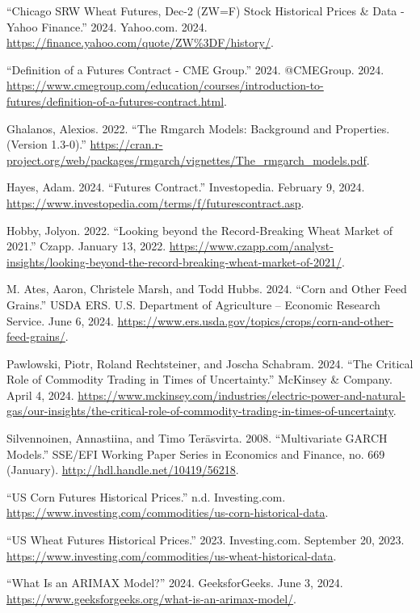 \documentclass[11pt]{article}
\newenvironment{references}
  {\begin{list}{}{%
      \setlength{\leftmargin}{0.4in}%
      \setlength{\itemindent}{-0.4in}%
      \setlength{\itemsep}{0.6\baselineskip}%
      \setlength{\parsep}{0pt}%
  }}
  {\end{list}}
\begin{document}
\begin{references}

\item ``Chicago SRW Wheat Futures, Dec-2 (ZW=F) Stock Historical Prices \& Data - Yahoo Finance.'' 2024. Yahoo.com. 2024. \url{https://finance.yahoo.com/quote/ZW\%3DF/history/}.

\item ``Definition of a Futures Contract - CME Group.'' 2024. @CMEGroup. 2024. \url{https://www.cmegroup.com/education/courses/introduction-to-futures/definition-of-a-futures-contract.html}.

\item Ghalanos, Alexios. 2022. ``The Rmgarch Models: Background and Properties. (Version 1.3-0).'' \url{https://cran.r-project.org/web/packages/rmgarch/vignettes/The_rmgarch_models.pdf}.

\item Hayes, Adam. 2024. ``Futures Contract.'' Investopedia. February 9, 2024. \url{https://www.investopedia.com/terms/f/futurescontract.asp}.

\item Hobby, Jolyon. 2022. ``Looking beyond the Record-Breaking Wheat Market of 2021.'' Czapp. January 13, 2022. \url{https://www.czapp.com/analyst-insights/looking-beyond-the-record-breaking-wheat-market-of-2021/}.

\item M. Ates, Aaron, Christele Marsh, and Todd Hubbs. 2024. ``Corn and Other Feed Grains.'' USDA ERS. U.S. Department of Agriculture -- Economic Research Service. June 6, 2024. \url{https://www.ers.usda.gov/topics/crops/corn-and-other-feed-grains/}.

\item Pawlowski, Piotr, Roland Rechtsteiner, and Joscha Schabram. 2024. ``The Critical Role of Commodity Trading in Times of Uncertainty.'' McKinsey \& Company. April 4, 2024. \url{https://www.mckinsey.com/industries/electric-power-and-natural-gas/our-insights/the-critical-role-of-commodity-trading-in-times-of-uncertainty}.

\item Silvennoinen, Annastiina, and Timo Ter\"asvirta. 2008. ``Multivariate GARCH Models.'' SSE/EFI Working Paper Series in Economics and Finance, no. 669 (January). \url{http://hdl.handle.net/10419/56218}.

\item ``US Corn Futures Historical Prices.'' n.d. Investing.com. \url{https://www.investing.com/commodities/us-corn-historical-data}.

\item ``US Wheat Futures Historical Prices.'' 2023. Investing.com. September 20, 2023. \url{https://www.investing.com/commodities/us-wheat-historical-data}.

\item ``What Is an ARIMAX Model?'' 2024. GeeksforGeeks. June 3, 2024. \url{https://www.geeksforgeeks.org/what-is-an-arimax-model/}.

\end{references}
\end{document}
